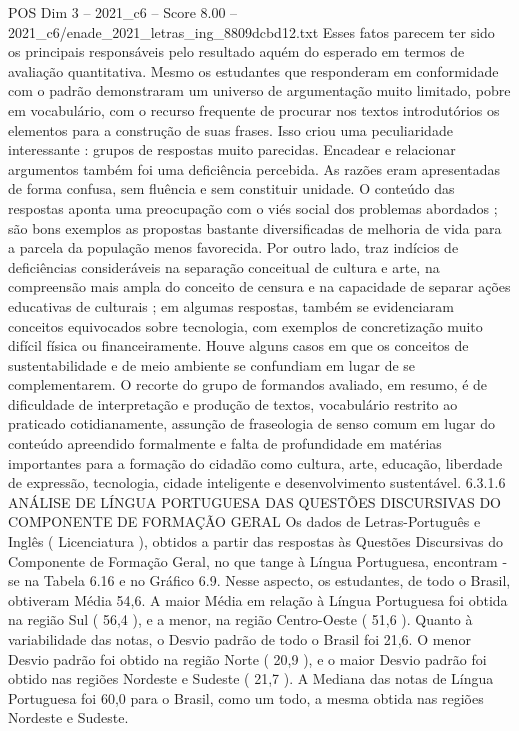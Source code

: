 \begin{textsample}{POS Dim 3 – 2021\_c6 – Score 8.00 – 2021\_c6/enade\_2021\_letras\_ing\_8809dcbd12.txt}
Esses fatos parecem ter sido os principais responsáveis pelo resultado aquém do esperado em termos de avaliação quantitativa.
Mesmo os estudantes que responderam em conformidade com o padrão demonstraram um universo de argumentação muito limitado, pobre em vocabulário, com o recurso frequente de procurar nos textos introdutórios os elementos para a construção de suas frases.
Isso criou uma peculiaridade interessante : grupos de respostas muito parecidas.
Encadear e relacionar argumentos também foi uma deficiência percebida.
As razões eram apresentadas de forma confusa, sem fluência e sem constituir unidade.
O conteúdo das respostas aponta uma preocupação com o viés social dos problemas abordados ; são bons exemplos as propostas bastante diversificadas de melhoria de vida para a parcela da população menos favorecida.
Por outro lado, traz indícios de deficiências consideráveis na separação conceitual de cultura e arte, na compreensão mais ampla do conceito de censura e na capacidade de separar ações educativas de culturais ; em algumas respostas, também se evidenciaram conceitos equivocados sobre tecnologia, com exemplos de concretização muito difícil física ou financeiramente.
Houve alguns casos em que os conceitos de sustentabilidade e de meio ambiente se confundiam em lugar de se complementarem.
O recorte do grupo de formandos avaliado, em resumo, é de dificuldade de interpretação e produção de textos, vocabulário restrito ao praticado cotidianamente, assunção de fraseologia de senso comum em lugar do conteúdo apreendido formalmente e falta de profundidade em matérias importantes para a formação do cidadão como cultura, arte, educação, liberdade de expressão, tecnologia, cidade inteligente e desenvolvimento sustentável. 6.3.1.6 ANÁLISE DE LÍNGUA PORTUGUESA DAS QUESTÕES DISCURSIVAS DO COMPONENTE DE FORMAÇÃO GERAL Os dados de Letras-Português e Inglês ( Licenciatura ), obtidos a partir das respostas às Questões Discursivas do Componente de Formação Geral, no que tange à Língua Portuguesa, encontram -se na Tabela 6.16 e no Gráfico 6.9.
Nesse aspecto, os estudantes, de todo o Brasil, obtiveram Média 54,6.
A maior Média em relação à Língua Portuguesa foi obtida na região Sul ( 56,4 ), e a menor, na região Centro-Oeste ( 51,6 ).
Quanto à variabilidade das notas, o Desvio padrão de todo o Brasil foi 21,6.
O menor Desvio padrão foi obtido na região Norte ( 20,9 ), e o maior Desvio padrão foi obtido nas regiões Nordeste e Sudeste ( 21,7 ).
A Mediana das notas de Língua Portuguesa foi 60,0 para o Brasil, como um todo, a mesma obtida nas regiões Nordeste e Sudeste.

\end{textsample}
